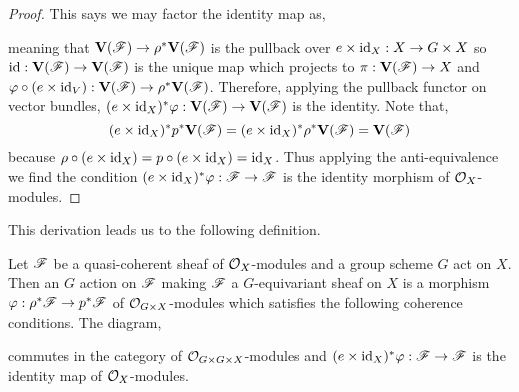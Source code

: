 \documentclass[12pt]{article}
\begin{document}
\begin{proof}
This says we may factor the identity map as,
\begin{center}
\end{center}
meaning that $\mathbf{V}(\mathscr{F}) \to \rho^* \mathbf{V}(\mathscr{F})$ is the pullback over $e \times \mathrm{id}_X : X \to G \times X$ so $\mathrm{id} : \mathbf{V}(\mathscr{F}) \to \mathbf{V}(\mathscr{F})$ is the unique map which projects to $\pi : \mathbf{V}(\mathscr{F}) \to X$ and $\varphi \circ (e \times \mathrm{id}_V) : \mathbf{V}(\mathscr{F}) \to \rho^* \mathbf{V}(\mathscr{F})$. Therefore, applying the pullback functor on vector bundles, $(e \times \mathrm{id}_X)^* \varphi : \mathbf{V}(\mathscr{F}) \to \mathbf{V}(\mathscr{F})$ is the identity. Note that,
\[ (e \times \mathrm{id}_X)^* p^* \mathbf{V}(\mathscr{F}) = (e \times \mathrm{id}_X)^* \rho^* \mathbf{V}(\mathscr{F}) = \mathbf{V}(\mathscr{F}) \]
because $\rho \circ (e \times \mathrm{id}_X) = p \circ (e \times \mathrm{id}_X) = \mathrm{id}_X$. Thus applying the anti-equivalence we find the condition $(e \times \mathrm{id}_X)^* \varphi : \mathscr{F} \to \mathscr{F}$ is the identity morphism of $\mathcal{O}_{X}$-modules. 
\end{proof}

\begin{remark}
This derivation leads us to the following definition.
\end{remark}

\begin{definition}
Let $\mathscr{F}$ be a quasi-coherent sheaf of $\mathcal{O}_{X}$-modules and a group scheme $G$ act on $X$. Then an $G$ action on $\mathscr{F}$ making $\mathscr{F}$ a $G$-equivariant sheaf on $X$ is a morphism $\varphi : \rho^* \mathscr{F} \to p^* \mathscr{F}$ of $\mathcal{O}_{G \times X}$-modules which satisfies the following coherence conditions. The diagram,
\begin{center}
\end{center}
commutes in the category of $\mathcal{O}_{G \times G \times X}$-modules
and $(e \times \mathrm{id}_X)^* \varphi : \mathscr{F} \to \mathscr{F}$ is the identity map of $\mathcal{O}_{X}$-modules.
\end{definition}
\end{document}
